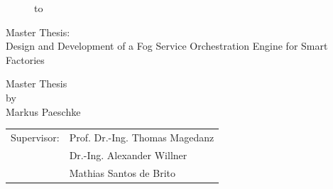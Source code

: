 \begin{titlepage}
\begin{figure}
  \begin{center}
    \hbox to 
  \end{center}
\end{figure}

\begin{center}
\rule{0pt}{0pt}
\vfill
\vfill
\vfill
\vfill

\begin{huge}
Master Thesis:\\[0.75ex]
Design and Development of a Fog Service Orchestration Engine for Smart Factories\\[0.75ex]
\end{huge}

\vfill
\vfill

Master Thesis\\ by\\

\vspace*{.5cm}
Markus Paeschke\\

\vfill
\vfill
\vfill
\vfill

\begin{tabular}{rl}
Supervisor: & Prof. Dr.-Ing. Thomas Magedanz\\
& Dr.-Ing. Alexander Willner\\
& Mathias Santos de Brito
\end{tabular}
\end{center}
\end{titlepage}
